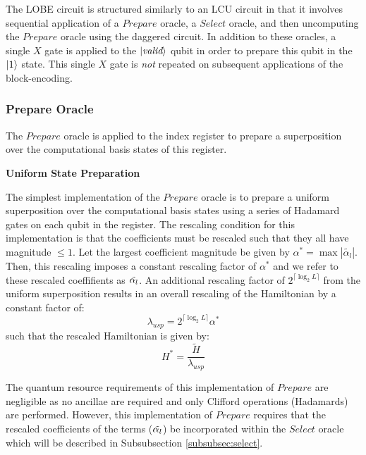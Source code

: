 The LOBE circuit is structured similarly to an LCU circuit in that it involves sequential application of a $\textit{Prepare}$ oracle, a $\textit{Select}$ oracle, and then uncomputing the $\textit{Prepare}$ oracle using the daggered circuit.
In addition to these oracles, a single $X$ gate is applied to the $\ket{\textit{valid}}$ qubit in order to prepare this qubit in the $\ket{1}$ state.
This single $X$ gate is \textit{not} repeated on subsequent applications of the block-encoding.

\subsubsection{Prepare Oracle}
The $\textit{Prepare}$ oracle is applied to the index register to prepare a superposition over the computational basis states of this register.

\textbf{Uniform State Preparation}

The simplest implementation of the $\textit{Prepare}$ oracle is to prepare a uniform superposition over the computational basis states using a series of Hadamard gates on each qubit in the register.
The rescaling condition for this implementation is that the coefficients must be rescaled such that they all have magnitude $\leq 1$.
Let the largest coefficient magnitude be given by $\alpha^* = \max{|\tilde{\alpha_l}|}$.
Then, this rescaling imposes a constant rescaling factor of $\alpha^*$ and we refer to these rescaled coeffifients as $\Tilde{\alpha_l}$.
An additional rescaling factor of $2^{\lceil \log_2{L} \rceil}$ from the uniform superposition results in an overall rescaling of the Hamiltonian by a constant factor of:
\begin{equation}
    \label{usp scale}
    \lambda_{usp} = 2^{\lceil \log_2{L} \rceil} \alpha^*
\end{equation}
such that the rescaled Hamiltonian is given by:
\begin{equation}
    \label{Hbar scale}
    H^* = \frac{\tilde{H}}{\lambda_{usp}}
\end{equation}

The quantum resource requirements of this implementation of $\textit{Prepare}$ are negligible as no ancillae are required and only Clifford operations (Hadamards) are performed.
However, this implementation of $\textit{Prepare}$ requires that the rescaled coefficients of the terms ($\Tilde{\alpha_l}$) be incorporated within the $\textit{Select}$ oracle which will be described in Subsubsection \ref{subsubsec:select}.

